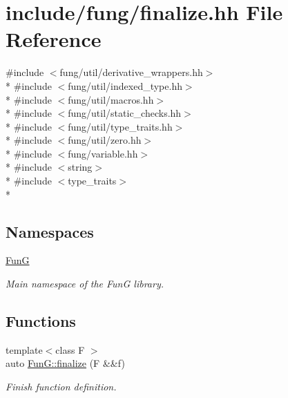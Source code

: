 \hypertarget{finalize_8hh}{}\section{include/fung/finalize.hh File Reference}
\label{finalize_8hh}
{\ttfamily \#include $<$fung/util/derivative\+\_\+wrappers.\+hh$>$}\\*
{\ttfamily \#include $<$fung/util/indexed\+\_\+type.\+hh$>$}\\*
{\ttfamily \#include $<$fung/util/macros.\+hh$>$}\\*
{\ttfamily \#include $<$fung/util/static\+\_\+checks.\+hh$>$}\\*
{\ttfamily \#include $<$fung/util/type\+\_\+traits.\+hh$>$}\\*
{\ttfamily \#include $<$fung/util/zero.\+hh$>$}\\*
{\ttfamily \#include $<$fung/variable.\+hh$>$}\\*
{\ttfamily \#include $<$string$>$}\\*
{\ttfamily \#include $<$type\+\_\+traits$>$}\\*
\subsection*{Namespaces}
\begin{DoxyCompactItemize}
\item 
 \hyperlink{namespaceFunG}{FunG}
\begin{DoxyCompactList}\small\item\em Main namespace of the FunG library. \end{DoxyCompactList}\end{DoxyCompactItemize}
\subsection*{Functions}
\begin{DoxyCompactItemize}
\item 
{\footnotesize template$<$class F $>$ }\\auto \hyperlink{namespaceFunG_ac59f2ececc3cd451860776320a4a93d5}{Fun\+G\+::finalize} (F \&\&f)
\begin{DoxyCompactList}\small\item\em Finish function definition. \end{DoxyCompactList}\end{DoxyCompactItemize}
